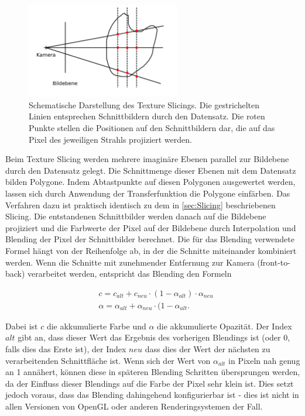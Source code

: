 \documentclass[a4paper,fontsize=12pt,toc=bib,parskip=half,ngerman]{scrartcl}
\begin{document}
\begin{figure}
	\centering
	\includegraphics[width=0.6\textwidth]{pictures/Texture_Slicing}
	\caption{Schematische Darstellung des Texture Slicings. Die gestrichelten Linien entsprechen Schnittbildern durch den Datensatz. Die roten Punkte stellen die Positionen auf den Schnittbildern dar, die auf das Pixel des jeweiligen Strahls projiziert werden.}
	\label{TextureSlicing}
\end{figure}

Beim Texture Slicing werden mehrere imagin\"are Ebenen parallel zur Bildebene durch den Datensatz gelegt. Die Schnittmenge dieser Ebenen mit dem Datensatz bilden Polygone. Indem Abtastpunkte auf diesen Polygonen ausgewertet werden, lassen sich durch Anwendung der Transferfunktion die Polygone einf\"arben. Das Verfahren dazu ist praktisch identisch zu dem in \cref{sec:Slicing} beschriebenen Slicing. Die entstandenen Schnittbilder werden danach auf die Bildebene projiziert und die Farbwerte der Pixel auf der Bildebene durch Interpolation und Blending der Pixel der Schnittbilder berechnet. Die f\"ur das Blending verwendete Formel h\"angt von der Reihenfolge ab, in der die Schnitte miteinander kombiniert werden. Wenn die Schnitte mit zunehmender Entfernung zur Kamera (front-to-back) verarbeitet werden, entspricht das Blending den Formeln

\begin{align}
&c = c_{alt} + c_{neu}\cdot(1-\alpha_{alt})\cdot\alpha_{neu}
\label{front-to-back-color}\\ 
&\alpha = \alpha_{alt} + \alpha_{neu}\cdot(1-\alpha_{alt}.
\label{front-to-back-alpha}
\end{align}

Dabei ist $c$ die akkumulierte Farbe und $\alpha$ die akkumulierte Opazit\"at. Der Index $alt$ gibt an, dass dieser Wert das Ergebnis des vorherigen Blendings ist (oder 0, falls dies das Erste ist), der Index $neu$ dass dies der Wert der n\"achsten zu verarbeitenden Schnittfl\"ache ist. Wenn sich der Wert von $\alpha_{alt}$ in Pixeln nah genug an 1 ann\"ahert, k\"onnen diese in sp\"ateren Blending Schritten \"ubersprungen werden, da der Einfluss dieser Blendings auf die Farbe der Pixel sehr klein ist. Dies setzt jedoch voraus, dass das Blending dahingehend konfigurierbar ist - dies ist nicht in allen Versionen von OpenGL oder anderen Renderingsystemen der Fall. 
\end{document}

